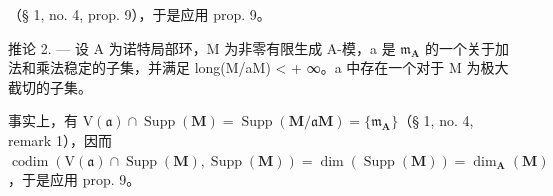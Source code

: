（§ 1, no. 4, prop. 9），于是应用 prop. 9。

推论 2. --- 设 A 为诺特局部环，M 为非零有限生成 A-模，a 是 \(\mathfrak{m}_{\mathbf{A}}\) 的一个关于加法和乘法稳定的子集，并满足 long(M/aM) \textless{} + ∞。a 中存在一个对于 M 为极大截切的子集。

事实上，有 \(\mathrm{V}(\mathfrak{a}) \cap \operatorname{Supp}(\mathbf{M}) = \operatorname{Supp}(\mathbf{M}/\mathfrak{a}\mathbf{M}) = \{\mathfrak{m}_{\mathbf{A}}\}\)（§ 1, no. 4, remark 1），因而 \(\operatorname{codim}(\mathrm{V}(\mathfrak{a}) \cap \operatorname{Supp}(\mathbf{M}), \operatorname{Supp}(\mathbf{M})) = \dim(\operatorname{Supp}(\mathbf{M})) = \dim_{\mathbf{A}}(\mathbf{M})\)，于是应用 prop. 9。

